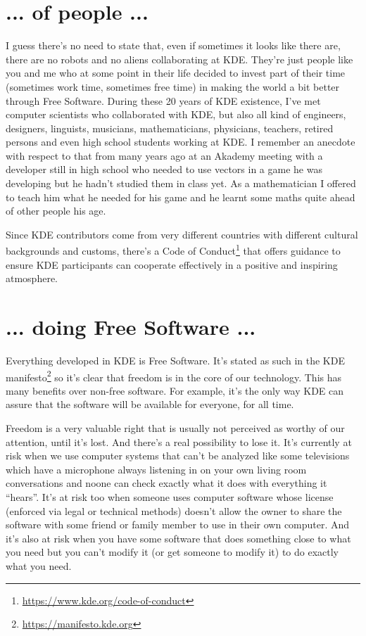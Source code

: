 \section*{... of people ...}
I guess there's no need to state that, even if sometimes it looks like there are, there are no robots and no aliens collaborating at KDE. They're just people like you and me who at some point in their life decided to invest part of their time (sometimes work time, sometimes free time) in making the world a bit better through Free Software. During these 20 years of KDE existence, I've met computer scientists who collaborated with KDE, but also all kind of engineers, designers, linguists, musicians, mathematicians, physicians, teachers, retired persons and even high school students working at KDE. I remember an anecdote with respect to that from many years ago at an Akademy meeting with a developer still in high school who needed to use vectors in a game he was developing but he hadn't studied them in class yet. As a mathematician I offered to teach him what he needed for his game and he learnt some maths quite ahead of other people his age.

Since KDE contributors come from very different countries with different cultural backgrounds and customs, there's a Code of Conduct\footnote{\url{https://www.kde.org/code-of-conduct}} that offers guidance to ensure KDE participants can cooperate effectively in a positive and inspiring atmosphere.

\section*{... doing Free Software ...}
Everything developed in KDE is Free Software. It's stated as such in the KDE manifesto\footnote{\url{https://manifesto.kde.org}} so it's clear that freedom is in the core of our technology. This has many benefits over non-free software. For example, it's the only way KDE can assure that the software will be available for everyone, for all time.

Freedom is a very valuable right that is usually not perceived as worthy of our attention, until it's lost. And there's a real possibility to lose it. It's currently at risk when we use computer systems that can't be analyzed like some televisions which have a microphone always listening in on your own living room conversations and noone can check exactly what it does with everything it “hears”. It's at risk too when someone uses computer software whose license (enforced via legal or technical methods) doesn't allow the owner to share the software with some friend or family member to use in their own computer. And it's also at risk when you have some software that does something close to what you need but you can't modify it (or get someone to modify it) to do exactly what you need.

